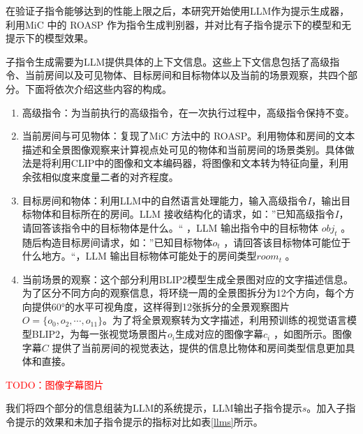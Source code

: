 \documentclass[bachelor]{thesis-uestc}
\begin{document}
在验证子指令能够达到的性能上限之后，本研究开始使用LLM作为提示生成器，利用MiC 中的 ROASP 作为指令生成判别器，并对比有子指令提示下的模型和无提示下的模型效果。

子指令生成需要为LLM提供具体的上下文信息。这些上下文信息包括了高级指令、当前房间以及可见物体、目标房间和目标物体以及当前的场景观察，共四个部分。下面将依次介绍这些内容的构成。

\begin{enumerate}
    \item 高级指令：为当前执行的高级指令，在一次执行过程中，高级指令保持不变。
    \item 当前房间与可见物体：复现了MiC 方法中的 ROASP。利用物体和房间的文本描述和全景图像观察来计算视点处可见的物体和当前房间的场景类别。具体做法是将利用CLIP中的图像和文本编码器，将图像和文本转为特征向量，利用余弦相似度来度量二者的对齐程度。
    \item 目标房间和物体：利用LLM中的自然语言处理能力，输入高级指令$I$，输出目标物体和目标所在的房间。LLM 接收结构化的请求，如：”已知高级指令$I$，请回答该指令中的目标物体是什么。“ ，LLM 输出指令中的目标物体 $obj_t$ 。随后构造目标房间请求，如：”已知目标物体$o_t$ ，请回答该目标物体可能位于什么地方。“，LLM 输出目标物体可能处于的房间类型$room_t$ 。
    \item 当前场景的观察：这个部分利用BLIP2模型生成全景图对应的文字描述信息。为了区分不同方向的观察信息，将环绕一周的全景图拆分为12个方向，每个方向提供60°的水平可视角度，这样得到12张拆分的全景观察图片$O=\{o_0,o_2,\cdots,o_{11}\}$。为了将全景观察转为文字描述，利用预训练的视觉语言模型BLIP2，为每一张视觉场景图片$o_i$生成对应的图像字幕$c_i$ ，如图所示。图像字幕$C$ 提供了当前房间的视觉表达，提供的信息比物体和房间类型信息更加具体和直接。
\end{enumerate}

\textcolor{red}{TODO：图像字幕图片}

我们将四个部分的信息组装为LLM的系统提示，LLM输出子指令提示$s$。加入子指令提示的效果和未加子指令提示的指标对比如表\ref{llms}所示。
\end{document}
